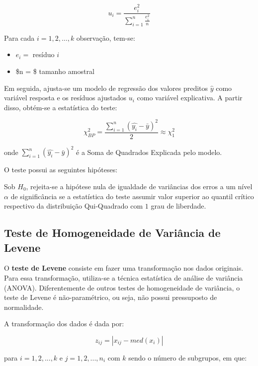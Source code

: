\documentclass[
]{estat/estat}
\providecommand{\tightlist}{%
  \setlength{\itemsep}{0pt}\setlength{\parskip}{0pt}}\usepackage{longtable,booktabs,array}
\begin{document}
\[ u_i = \frac{e_i^2}{\displaystyle \sum_{i=1}^n \frac{e_i^2}{n}} \]

Para cada \(i=1, 2, \ldots, k\) observação, tem-se:

\begin{itemize}
\tightlist
\item
  \(e_i =\) resíduo \(i\)
\item
  \$n = \$ tamanho amostral
\end{itemize}

Em seguida, ajusta-se um modelo de regressão dos valores preditos
\(\hat{y}\) como variável resposta e os resíduos ajustados \(u_i\) como
variável explicativa. A partir disso, obtém-se a estatística do teste:

\[ \chi^2_{BP} = \frac{\displaystyle \sum^n_{i=1}\left(\hat{y_i} - \bar{y}\right)^2}{2} \approx \chi^2_{1} \]

onde \(\displaystyle \sum^n_{i=1}\left(\hat{y_i} - \bar{y}\right)^2\) é
a Soma de Quadrados Explicada pelo modelo.

O teste possui as seguintes hipóteses:


Sob \(H_0\), rejeita-se a hipótese nula de igualdade de variâncias dos
erros a um nível \(\alpha\) de significância se a estatística do teste
assumir valor superior ao quantil crítico respectivo da distribuição
Qui-Quadrado com \(1\) grau de liberdade.

\hypertarget{teste-de-homogeneidade-de-variuxe2ncia-de-levene}{%
\subsection{Teste de Homogeneidade de Variância de
Levene}\label{teste-de-homogeneidade-de-variuxe2ncia-de-levene}}

O \textbf{teste de Levene} consiste em fazer uma transformação nos dados
originais. Para essa transformação, utiliza-se a técnica estatística de
análise de variância (ANOVA). Diferentemente de outros testes de
homogeneidade de variância, o teste de Levene é não-paramétrico, ou
seja, não possui pressuposto de normalidade.

A transformação dos dados é dada por:

\[ z_{ij} = |x_{ij} - med(x_i)| \]

para \(i=1,2,...,k\) e \(j=1,2,...,n_i\) com \(k\) sendo o número de
subgrupos, em que:
\end{document}
